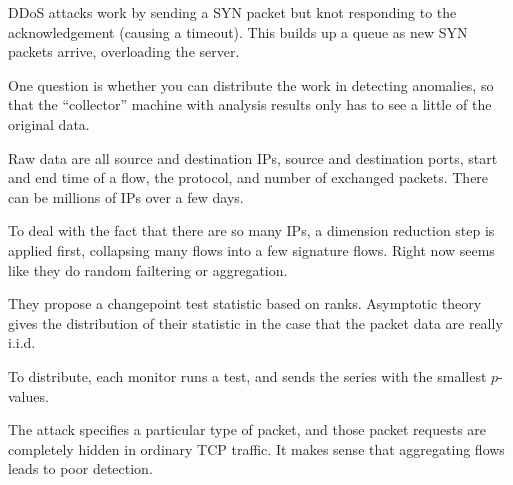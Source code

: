 \documentclass{article}
\begin{document}
DDoS attacks work by sending a SYN packet but knot responding to the
acknowledgement (causing a timeout). This builds up a queue as new SYN packets
arrive, overloading the server.

One question is whether you can distribute the work in detecting anomalies, so
that the ``collector'' machine with analysis results only has to see a little of
the original data.

Raw data are all source and destination IPs, source and destination ports, start
and end time of a flow, the protocol, and number of exchanged packets. There can
be millions of IPs over a few days.

To deal with the fact that there are so many IPs, a dimension reduction step is
applied first, collapsing many flows into a few signature flows. Right now seems
like they do random failtering or aggregation.

They propose a changepoint test statistic based on ranks. Asymptotic theory
gives the distribution of their statistic in the case that the packet data are
really i.i.d.

To distribute, each monitor runs a test, and sends the series with the smallest
$p$-values.

The attack specifies a particular type of packet, and those packet requests are
completely hidden in ordinary TCP traffic. It makes sense that aggregating flows
leads to poor detection.
\end{document}
